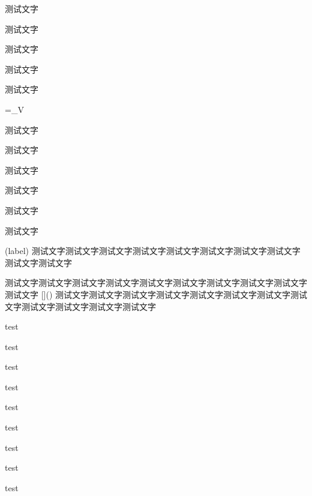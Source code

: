 \begin{Quiz}
\Thinking
	\begin{QuestionItem}
		\item 测试文字
		\item 测试文字
		\item 测试文字
		\item 测试文字
	\end{QuestionItem}


\begin{Definition}[测试文字]
	测试文字
	\begin{flalign}
		\Psi=\int_\Omega{}V
	\end{flalign}
\end{Definition}

\begin{Lemma}
	测试文字
\end{Lemma}

\begin{Theorem}[测试文字]
	测试文字
\end{Theorem}

\begin{Axiom}[测试文字][测试文字]
	测试文字
\end{Axiom}


\begin{Proposition}
	测试文字
\end{Proposition}


\begin{Corollary}
	测试文字
\end{Corollary}

\begin{Lemma}
	测试文字
\end{Lemma}


\begin{Lemma*}[测试文字测试文字](label)
	测试文字测试文字测试文字测试文字测试文字测试文字测试文字测试文字测试文字测试文字
	
	测试文字测试文字测试文字测试文字测试文字测试文字测试文字测试文字测试文字测试文字
	[]()
	\zhlipsum
	测试文字测试文字测试文字测试文字测试文字测试文字测试文字测试文字测试文字测试文字测试文字测试文字
	\tcblower
	\zhlipsum[2]
	\zhlipsum[2]
\end{Lemma*}






\begin{UnnumberedItem}[3]
\item test
\item test
\item test
\item test
\item test
\item test
\item test
\item test
\item test
\end{UnnumberedItem}


\end{Quiz}
